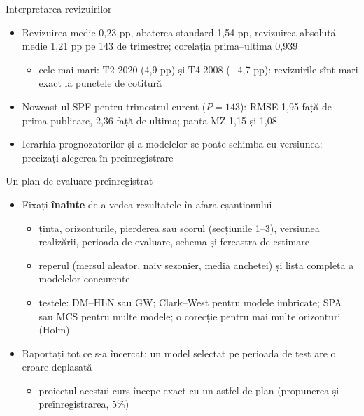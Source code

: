 \begin{frame}{Interpretarea revizuirilor}
\itemsize{\small}
\begin{itemize}
    \item Revizuirea medie 0{,}23 pp, abaterea standard 1{,}54 pp, revizuirea absolută medie 1{,}21 pp pe 143 de trimestre; corelația prima--ultima 0{,}939
    \begin{itemize}
        \item cele mai mari: T2 2020 (4{,}9 pp) și T4 2008 (\ensuremath{-}4{,}7 pp): revizuirile sînt mari exact la punctele de cotitură
    \end{itemize}
    \item Nowcast-ul SPF pentru trimestrul curent ($P = 143$): RMSE 1{,}95 față de prima publicare, 2{,}36 față de ultima; panta MZ 1{,}15 și 1{,}08
    \item Ierarhia prognozatorilor și a modelelor se poate schimba cu versiunea: precizați alegerea în preînregistrare
\end{itemize}
\end{frame}

\begin{frame}{Un plan de evaluare preînregistrat}
\itemsize{\small}
\begin{itemize}
    \item Fixați \textbf{înainte} de a vedea rezultatele în afara eșantionului
    \begin{itemize}
        \item ținta, orizonturile, pierderea sau scorul (secțiunile 1--3), versiunea realizării, perioada de evaluare, schema și fereastra de estimare
        \item reperul (mersul aleator, naiv sezonier, media anchetei) și lista completă a modelelor concurente
        \item testele: DM--HLN sau GW; Clark--West pentru modele imbricate; SPA sau MCS pentru multe modele; o corecție pentru mai multe orizonturi (Holm)
    \end{itemize}
    \item Raportați tot ce s-a încercat; un model selectat pe perioada de test are o eroare deplasată
    \begin{itemize}
        \item proiectul acestui curs începe exact cu un astfel de plan (propunerea și preînregistrarea, 5\%)
    \end{itemize}
\end{itemize}
\end{frame}

